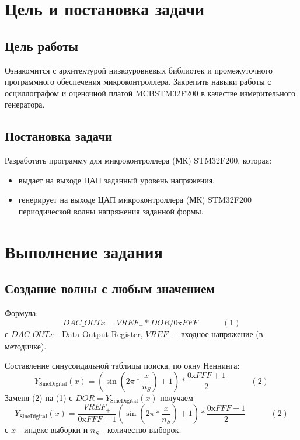 \documentclass[12pt]{article} %
\begin{document}
\begin{center}

\end{center}
\doublespacing
\tableofcontents
\newpage
\section{Цель и постановка задачи}
\subsection{Цель работы}
Ознакомится с архитектурой низкоуровневых библиотек и промежуточного программного обеспечения микроконтроллера. Закрепить навыки работы с осциллографом и оценочной платой MCBSTM32F200 в качестве измерительного генератора.

\subsection{Постановка задачи}
Разработать программу для микроконтроллера (МК) STM32F200, которая:\\

\begin{itemize}
\item выдает на выходе ЦАП заданный уровень напряжения.
\item генерирует на выходе ЦАП микроконтроллера (МК) STM32F200 периодической волны напряжения заданной формы.
\end{itemize}

\section{Выполнение задания}
\subsection{Создание волны с любым значением}
Формула: 
\[
	DAC\_OUTx = VREF_+ * DOR / 0\text{x}FFF \quad\quad\quad (1)
\]
с $DAC\_OUTx$ - Data Output Register, $VREF_+$ - входное напряжение (в методичке).

Составление синусоидальной таблицы поиска, по окну Неннинга:
\[
	Y_\text{SineDigital}(x) = \left(\sin{\left(2\pi*\frac{x}{n_S}\right)}+1\right)*\frac{0\text{x}FFF+1}{2} \quad\quad\quad (2)
	\]
Заменя (2) на (1) с $DOR = Y_\text{SineDigital}(x)$ получаем 
\[
	Y_\text{SineDigital}(x) = \frac{VREF_+}{0\text{x}FFF+1}\left(\sin{\left(2\pi*\frac{x}{n_S}\right)}+1\right)*\frac{0\text{x}FFF+1}{2} \quad\quad\quad (2)
	\]
с $x$ - индекс выборки и $n_S$ - количество выборок.  
\end{document}
